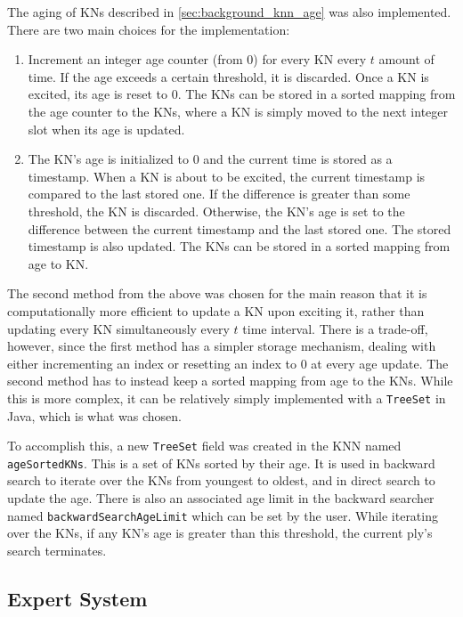 \documentclass[titlepage,11pt]{article}
\newcommand{\code}[1]{\texttt{#1}}
\begin{document}
The aging of KNs described in \cref{sec:background_knn_age} was also implemented. There are two main choices for the implementation:

\begin{enumerate}
	\item Increment an integer age counter (from 0) for every KN every $t$ amount of time. If the age exceeds a certain threshold, it is discarded. Once a KN is excited, its age is reset to 0. The KNs can be stored in a sorted mapping from the age counter to the KNs, where a KN is simply moved to the next integer slot when its age is updated.
	
	\item The KN's age is initialized to 0 and the current time is stored as a timestamp. When a KN is about to be excited, the current timestamp is compared to the last stored one. If the difference is greater than some threshold, the KN is discarded. Otherwise, the KN's age is set to the difference between the current timestamp and the last stored one. The stored timestamp is also updated. The KNs can be stored in a sorted mapping from age to KN.
\end{enumerate}

The second method from the above was chosen for the main reason that it is computationally more efficient to update a KN upon exciting it, rather than updating every KN simultaneously every $t$ time interval. There is a trade-off, however, since the first method has a simpler storage mechanism, dealing with either incrementing an index or resetting an index to 0 at every age update. The second method has to instead keep a sorted mapping from age to the KNs. While this is more complex, it can be relatively simply implemented with a \code{TreeSet} in Java, which is what was chosen.

To accomplish this, a new \code{TreeSet} field was created in the KNN named \code{ageSortedKNs}. This is a set of KNs sorted by their age. It is used in backward search to iterate over the KNs from youngest to oldest, and in direct search to update the age. There is also an associated age limit in the backward searcher named \code{backwardSearchAgeLimit} which can be set by the user. While iterating over the KNs, if any KN's age is greater than this threshold, the current ply's search terminates.

\subsection{Expert System}
\end{document}
